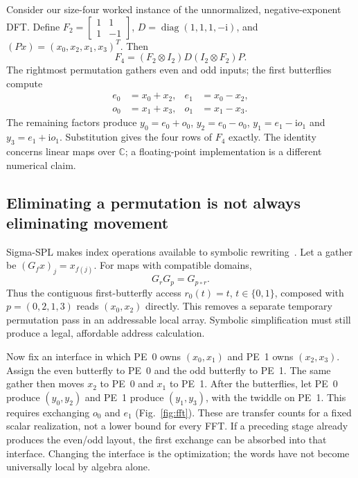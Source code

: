 \documentclass[final,3p,times,authoryear]{elsarticle}
\newcommand{\C}{\mathbb{C}}
\begin{document}
Consider our size-four worked instance of the unnormalized, negative-exponent DFT. Define $F_2=\left[\begin{smallmatrix}1&1\\1&-1\end{smallmatrix}\right]$, $D=\operatorname{diag}(1,1,1,-\mathrm{i})$, and $(Px)=(x_0,x_2,x_1,x_3)^T$. Then
\begin{equation}\label{eq:fft}
 F_4=(F_2\otimes I_2)D(I_2\otimes F_2)P.
\end{equation}
The rightmost permutation gathers even and odd inputs; the first butterflies compute
\begin{align}
 e_0&=x_0+x_2,& e_1&=x_0-x_2,\\
 o_0&=x_1+x_3,& o_1&=x_1-x_3.
\end{align}
The remaining factors produce $y_0=e_0+o_0$, $y_2=e_0-o_0$, $y_1=e_1-\mathrm{i}o_1$ and $y_3=e_1+\mathrm{i}o_1$. Substitution gives the four rows of $F_4$ exactly. The identity concerns linear maps over $\C$; a floating-point implementation is a different numerical claim.

\subsection{Eliminating a permutation is not always eliminating movement}
Sigma-SPL makes index operations available to symbolic rewriting~\citep{sigmaspl2005}. Let a gather be $(G_f x)_j=x_{f(j)}$. For maps with compatible domains,
\begin{equation}\label{eq:gather}
 G_rG_p=G_{p\circ r}.
\end{equation}
Thus the contiguous first-butterfly access $r_0(t)=t$, $t\in\{0,1\}$, composed with $p=(0,2,1,3)$ reads $(x_0,x_2)$ directly. This removes a separate temporary permutation pass in an addressable local array. Symbolic simplification must still produce a legal, affordable address calculation.

Now fix an interface in which PE~0 owns $(x_0,x_1)$ and PE~1 owns $(x_2,x_3)$. Assign the even butterfly to PE~0 and the odd butterfly to PE~1. The same gather then moves $x_2$ to PE~0 and $x_1$ to PE~1. After the butterflies, let PE~0 produce $(y_0,y_2)$ and PE~1 produce $(y_1,y_3)$, with the twiddle on PE~1. This requires exchanging $o_0$ and $e_1$ (Fig.~\ref{fig:fft}). These are transfer counts for a fixed scalar realization, not a lower bound for every FFT. If a preceding stage already produces the even/odd layout, the first exchange can be absorbed into that interface. Changing the interface is the optimization; the words have not become universally local by algebra alone.
\end{document}
